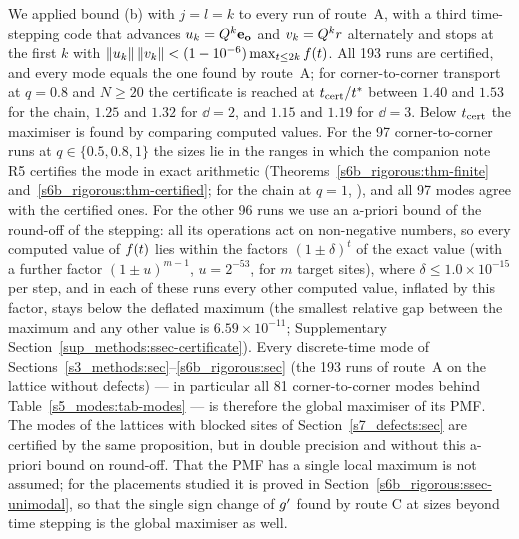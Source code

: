We applied bound (b) with $j=l=k$ to every run of route~A, with a third time-stepping code that advances
$u_k=Q^{k}\mathbf{e}_{\mathbf{o}}$ and $v_k=Q^{k}r$ alternately and stops at the first $k$ with
$\|u_k\|\,\|v_k\|<(1-10^{-6})\max_{t\le2k}f(t)$. All 193 runs are certified, and every mode equals the one found
by route~A; for corner-to-corner transport at $q=0.8$ and $N\ge20$ the certificate is reached at $t_{\mathrm{cert}}/t^{*}$
between $1.40$ and $1.53$ for the chain, $1.25$ and $1.32$ for $\dd=2$, and $1.15$ and $1.19$ for $\dd=3$.
Below $t_{\mathrm{cert}}$ the maximiser is found by comparing computed values. For the 97 corner-to-corner runs at $q\in\{0.5,0.8,1\}$ the
sizes lie in the ranges in which the companion note R5 certifies the mode in exact arithmetic
(Theorems~\ref{s6b_rigorous:thm-finite} and~\ref{s6b_rigorous:thm-certified}; for the chain at $q=1$,
), and all 97 modes agree with the certified ones. For the other 96 runs we use an a-priori bound
of the round-off of the stepping: all its operations act on non-negative numbers, so every computed value of $f(t)$
lies within the factors $(1\pm\delta)^{t}$ of the exact value (with a further factor $(1\pm u)^{m-1}$, $u=2^{-53}$, for
$m$ target sites), where $\delta\le1.0\times10^{-15}$ per step, and in each of
these runs every other computed value, inflated by this factor, stays below the deflated maximum (the smallest relative
gap between the maximum and any other value is $6.59\times10^{-11}$; Supplementary
Section~\ref{sup_methods:ssec-certificate}). Every discrete-time mode of Sections~\ref{s3_methods:sec}--\ref{s6b_rigorous:sec}
(the 193 runs of route~A on the lattice without defects) --- in particular all 81 corner-to-corner modes behind
Table~\ref{s5_modes:tab-modes} --- is therefore the global maximiser of its PMF. The modes of the lattices with blocked
sites of Section~\ref{s7_defects:sec} are certified by the same proposition, but in double precision and without this
a-priori bound on round-off.
That the PMF has a single local maximum is not assumed; for the placements studied it is proved in
Section~\ref{s6b_rigorous:ssec-unimodal}, so that the single sign change of $g'$ found by route C at sizes beyond
time stepping is the global maximiser as well.
